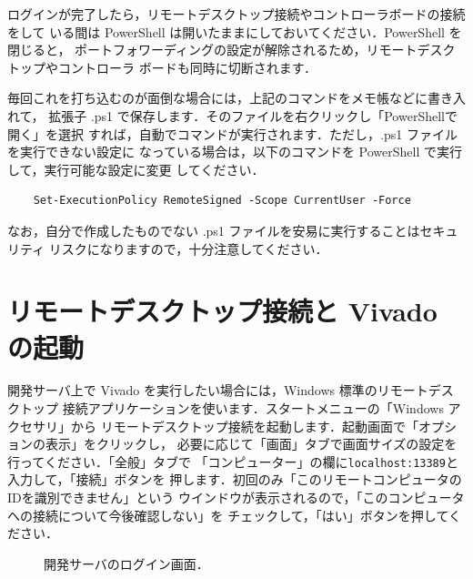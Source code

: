ログインが完了したら，リモートデスクトップ接続やコントローラボードの接続をして
いる間は PowerShell は開いたままにしておいてください．PowerShell を閉じると，
ポートフォワーディングの設定が解除されるため，リモートデスクトップやコントローラ
ボードも同時に切断されます．

毎回これを打ち込むのが面倒な場合には，上記のコマンドをメモ帳などに書き入れて，
拡張子 .ps1 で保存します．そのファイルを右クリックし「PowerShellで開く」を選択
すれば，自動でコマンドが実行されます．ただし，.ps1 ファイルを実行できない設定に
なっている場合は，以下のコマンドを PowerShell で実行して，実行可能な設定に変更
してください．
\begin{verbatim}
    Set-ExecutionPolicy RemoteSigned -Scope CurrentUser -Force
\end{verbatim}
なお，自分で作成したものでない .ps1 ファイルを安易に実行することはセキュリティ
リスクになりますので，十分注意してください．

\section{リモートデスクトップ接続と Vivado の起動}

開発サーバ上で Vivado を実行したい場合には，Windows 標準のリモートデスクトップ
接続アプリケーションを使います．スタートメニューの「Windows アクセサリ」から
リモートデスクトップ接続を起動します．起動画面で「オプションの表示」をクリックし，
必要に応じて「画面」タブで画面サイズの設定を行ってください．「全般」タブで
「コンピューター」の欄に\texttt{localhost:13389}と入力して，「接続」ボタンを
押します．初回のみ「このリモートコンピュータのIDを識別できません」という
ウインドウが表示されるので，「このコンピュータへの接続について今後確認しない」を
チェックして，「はい」ボタンを押してください．

\begin{figure}[ht]
 \centering
 \caption{開発サーバのログイン画面．}
 \label{fig:rdp_login}
\end{figure}

